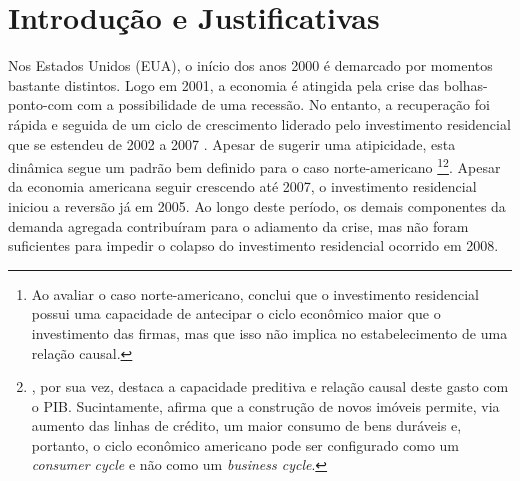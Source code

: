 \section{Introdução e Justificativas}\label{Intro}





Nos Estados Unidos (EUA), o início dos anos 2000 é demarcado por momentos bastante distintos. Logo em 2001, a economia é atingida pela crise das bolhas-ponto-com com a possibilidade de uma recessão. No entanto, a recuperação foi rápida e seguida de um ciclo de crescimento liderado pelo investimento residencial que se estendeu de 2002 a 2007 \cite{cagnin_o_2007}. Apesar de sugerir uma atipicidade, esta dinâmica segue um padrão bem definido para o caso norte-americano \cites{green_follow_1997}{leamer_housing_2007}{fiebiger_trend_2017}\footnote{
	Ao avaliar o caso norte-americano, \textcite{green_follow_1997} conclui que o investimento residencial possui uma capacidade  de antecipar o ciclo econômico maior que o investimento das firmas, mas que isso não implica no estabelecimento de uma relação causal. 
}\footnote{
	\textcite{leamer_housing_2007}, por sua vez, destaca a capacidade preditiva e relação causal  deste gasto com o PIB. Sucintamente, afirma que a construção de novos imóveis permite, via aumento das linhas de crédito, um maior consumo de bens duráveis e, portanto, o ciclo econômico americano pode ser configurado como um \textit{consumer cycle} e não como um \textit{business cycle}.}. Apesar da economia americana seguir crescendo até 2007, o investimento residencial iniciou a reversão já em 2005. Ao longo deste período, os demais componentes da demanda agregada contribuíram para o adiamento da crise, mas não foram suficientes para impedir o colapso do investimento residencial ocorrido em 2008. 

